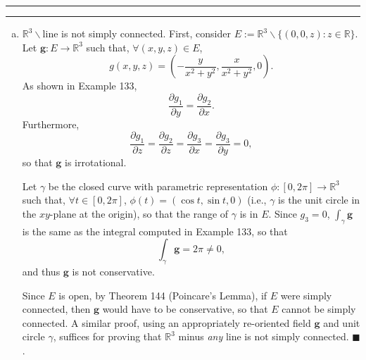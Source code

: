 \documentclass[11pt]{article}
\newcounter{questionCounter}
\newcounter{partCounter}[questionCounter]
\newenvironment{question}[2][\arabic{questionCounter}]{%
    \setcounter{partCounter}{0}%
    \vspace{.25in} \hrule \vspace{0.5em}%
        \noindent{\bf #2}%
    \vspace{0.8em} \hrule \vspace{.10in}%
    \addtocounter{questionCounter}{1}%
}{}
\begin{document}
\begin{question}{Problem 3}
\begin{enumerate}[(a)]
\item $\mathbb{R}^3\backslash$line is not simply connected. First, consider
$E := \mathbb{R}^3\backslash\{(0,0,z) : z \in \mathbb{R}\}$. Let
$\mathbf{g} : E \rightarrow \mathbb{R}^3$ such that, $\forall (x,y,z) \in E$,
\[g(x,y,z) = \left(-\frac{y}{x^2 + y^2}, \frac{x}{x^2 + y^2}, 0\right).\]
As shown in Example 133,
\[\frac{\partial g_1}{\partial y} = \frac{\partial g_2}{\partial x}.\]
Furthermore,
\[  \frac{\partial g_1}{\partial z}
  = \frac{\partial g_2}{\partial z}
  = \frac{\partial g_3}{\partial x}
  = \frac{\partial g_3}{\partial y} = 0,\] so that $\mathbf{g}$ is
irrotational.

Let $\gamma$ be the closed curve with parametric representation
$\phi: [0,2 \pi] \rightarrow \mathbb{R}^3$ such that,
$\forall t \in [0,2 \pi]$, $\phi(t) = (\cos t, \sin t, 0)$ (i.e., $\gamma$ is
the unit circle in the $xy$-plane at the origin), so that the range of
$\gamma$ is in $E$. Since $g_3 = 0$, $\int_{\gamma} \mathbf{g}$ is the same as
the integral computed in Example 133, so that
\[\int_{\gamma} \mathbf{g} = 2 \pi \neq 0,\] and thus $\mathbf{g}$ is not
conservative.

Since $E$ is open, by Theorem 144 (Poincare's Lemma), if $E$ were simply
connected, then $\mathbf{g}$ would have to be conservative, so that $E$ cannot
be simply connected. A similar proof, using an appropriately re-oriented field
$\mathbf{g}$ and unit circle $\gamma$, suffices for proving that
$\mathbb{R}^3$ minus \emph{any} line is not simply connected.
\quad $\blacksquare$.
\end{enumerate}
\end{question}
\end{document}
